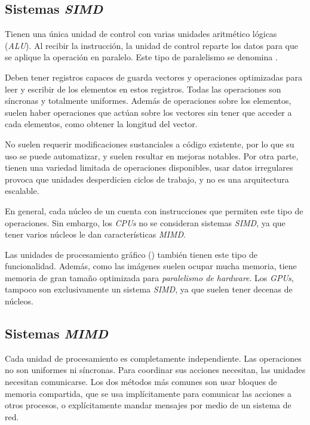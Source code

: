 \subsection{Sistemas \emph{SIMD}}

Tienen una única unidad de control con varias unidades aritmético lógicas
(\emph{ALU}). Al recibir la instrucción, la unidad de control reparte los
datos para que se aplique la operación en paralelo. Este tipo de paralelismo se
denomina .

Deben tener registros capaces de guarda vectores y operaciones optimizadas para
leer y escribir de los elementos en estos registros. Todas las operaciones son
síncronas y totalmente uniformes. Además de operaciones sobre los elementos,
suelen haber operaciones que actúan sobre los vectores sin tener que acceder a
cada elementos, como obtener la longitud del vector.

No suelen requerir modificaciones sustanciales a código existente, por lo que
su uso se puede automatizar, y suelen resultar en mejoras notables. Por otra
parte, tienen una variedad limitada de operaciones disponibles, usar datos
irregulares provoca que unidades desperdicien ciclos de trabajo, y no es una
arquitectura escalable.

En general, cada núcleo de un  cuenta con instrucciones que permiten
este tipo de operaciones. Sin embargo, los \emph{CPUs} no se consideran
sistemas \emph{SIMD}, ya que tener varios núcleos le dan características
\emph{MIMD}.

Las unidades de procesamiento gráfico () también tienen este tipo de
funcionalidad. Además, como las imágenes suelen ocupar mucha memoria, tiene
memoria de gran tamaño optimizada para \emph{paralelismo de hardware}.
Los \emph{GPUs}, tampoco son exclusivamente un sistema \emph{SIMD}, ya que
suelen tener decenas de núcleos.

\subsection{Sistemas \textit{MIMD}}

Cada unidad de procesamiento es completamente independiente. Las operaciones no
son uniformes ni síncronas. Para coordinar sus acciones necesitan, las
unidades necesitan comunicarse. Los dos métodos más comunes son usar bloques de
memoria compartida, que se usa implícitamente para comunicar las acciones a
otros procesos, o explícitamente mandar mensajes por medio de un sistema de
red.

